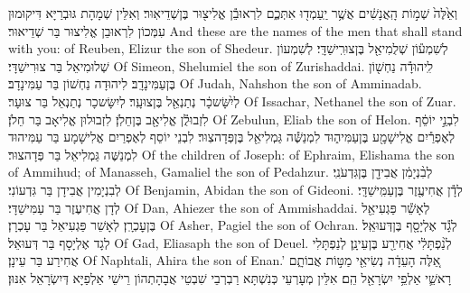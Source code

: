 {וְאֵ֙לֶּה֙ שְׁמ֣וֹת הָֽאֲנָשִׁ֔ים אֲשֶׁ֥ר יַֽעַמְד֖וּ אִתְּכֶ֑ם לִרְאוּבֵ֕ן אֱלִיצ֖וּר בֶּן\maqqaf שְׁדֵיאֽוּר׃}
{וְאִלֵּין שְׁמָהָת גּוּבְרַיָּא דִּיקוּמוּן עִמְּכוֹן לִרְאוּבֵן אֱלִיצוּר בַּר שְׁדֵיאוּר׃}
{And these are the names of the men that shall stand with you: of Reuben, Elizur the son of Shedeur.}{}
{לְשִׁמְע֕וֹן שְׁלֻמִיאֵ֖ל בֶּן\maqqaf צוּרִֽישַׁדָּֽי׃}
{לְשִׁמְעוֹן שְׁלוּמִיאֵל בַּר צוּרִישַׁדָּי׃}
{Of Simeon, Shelumiel the son of Zurishaddai.}{}
{לִֽיהוּדָ֕ה נַחְשׁ֖וֹן בֶּן\maqqaf עַמִּינָדָֽב׃}
{לִיהוּדָה נַחְשׁוֹן בַּר עַמִּינָדָב׃}
{Of Judah, Nahshon the son of Amminadab.}{}
{לְיִ֨שָּׂשכָ֔ר נְתַנְאֵ֖ל בֶּן\maqqaf צוּעָֽר׃}
{לְיִשָּׂשכָר נְתַנְאֵל בַּר צוּעָר׃}
{Of Issachar, Nethanel the son of Zuar.}{}
{לִזְבוּלֻ֕ן אֱלִיאָ֖ב בֶּן\maqqaf חֵלֹֽן׃}
{לִזְבוּלוּן אֱלִיאָב בַּר חֵלֹן׃}
{Of Zebulun, Eliab the son of Helon.}{}
{לִבְנֵ֣י יוֹסֵ֔ף לְאֶפְרַ֕יִם אֱלִישָׁמָ֖ע בֶּן\maqqaf עַמִּיה֑וּד לִמְנַשֶּׁ֕ה גַּמְלִיאֵ֖ל בֶּן\maqqaf פְּדָהצֽוּר׃}
{לִבְנֵי יוֹסֵף לְאֶפְרַיִם אֱלִישָׁמָע בַּר עַמִּיהוּד לִמְנַשֶּׁה גַּמְלִיאֵל בַּר פְּדָהצוּר׃}
{Of the children of Joseph: of Ephraim, Elishama the son of Ammihud; of Manasseh, Gamaliel the son of Pedahzur.}{}
{לְבִ֨נְיָמִ֔ן אֲבִידָ֖ן בֶּן\maqqaf גִּדְעֹנִֽי׃}
{לְבִנְיָמִין אֲבִידָן בַּר גִּדְעוֹנִי׃}
{Of Benjamin, Abidan the son of Gideoni.}{}
{לְדָ֕ן אֲחִיעֶ֖זֶר בֶּן\maqqaf עַמִּֽישַׁדָּֽי׃}
{לְדָן אֲחִיעֶזֶר בַּר עַמִּישַׁדָּי׃}
{Of Dan, Ahiezer the son of Ammishaddai.}{}
{לְאָשֵׁ֕ר פַּגְעִיאֵ֖ל בֶּן\maqqaf עׇכְרָֽן׃}
{לְאָשֵׁר פַּגְעִיאֵל בַּר עָכְרָן׃}
{Of Asher, Pagiel the son of Ochran.}{}
{לְגָ֕ד אֶלְיָסָ֖ף בֶּן\maqqaf דְּעוּאֵֽל׃}
{לְגָד אֶלְיָסָף בַּר דְּעוּאֵל׃}
{Of Gad, Eliasaph the son of Deuel.}{}
{לְנַ֨פְתָּלִ֔י אֲחִירַ֖ע בֶּן\maqqaf עֵינָֽן׃}
{לְנַפְתָּלִי אֲחִירַע בַּר עֵינָן׃}
{Of Naphtali, Ahira the son of Enan.’}{}
{אֵ֚לֶּה  הָעֵדָ֔ה נְשִׂיאֵ֖י מַטּ֣וֹת אֲבוֹתָ֑ם רָאשֵׁ֛י אַלְפֵ֥י יִשְׂרָאֵ֖ל הֵֽם׃}
{אִלֵּין מְעָרְעֵי כְּנִשְׁתָּא רַבְרְבֵי שִׁבְטֵי אֲבָהָתְהוֹן רֵישֵׁי אַלְפַיָּא דְּיִשְׂרָאֵל אִנּוּן׃}
